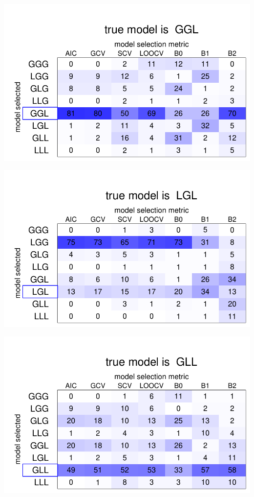 \documentclass{article}\usepackage[]{graphicx}\usepackage[]{color}
\makeatletter
\def\maxwidth{ %
  \ifdim\Gin@nat@width>\linewidth
    \linewidth
  \else
    \Gin@nat@width
  \fi
}
\newenvironment{knitrout}{}{} %
\makeatother
\begin{document}
\begin{knitrout}
\includegraphics[width=\maxwidth]{figure/ModelSelectionTabulations15} 

\includegraphics[width=\maxwidth]{figure/ModelSelectionTabulations16} 

\includegraphics[width=\maxwidth]{figure/ModelSelectionTabulations17} 


\end{knitrout}
\end{document}
